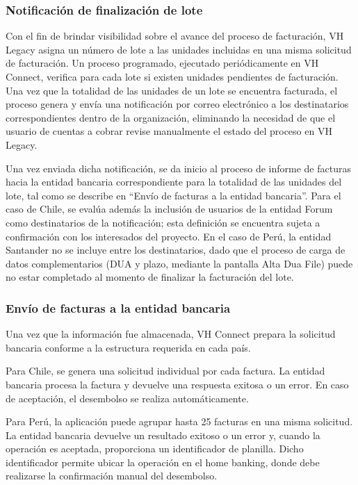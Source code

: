\subsubsection{Notificación de finalización de lote}

Con el fin de brindar visibilidad sobre el avance del proceso de facturación, VH Legacy asigna un número de lote a las unidades incluidas en una misma solicitud de facturación. Un proceso programado, ejecutado periódicamente en VH Connect, verifica para cada lote si existen unidades pendientes de facturación. Una vez que la totalidad de las unidades de un lote se encuentra facturada, el proceso genera y envía una notificación por correo electrónico a los destinatarios correspondientes dentro de la organización, eliminando la necesidad de que el usuario de cuentas a cobrar revise manualmente el estado del proceso en VH Legacy.

Una vez enviada dicha notificación, se da inicio al proceso de informe de facturas hacia la entidad bancaria correspondiente para la totalidad de las unidades del lote, tal como se describe en ``Envío de facturas a la entidad bancaria''. Para el caso de Chile, se evalúa además la inclusión de usuarios de la entidad Forum como destinatarios de la notificación; esta definición se encuentra sujeta a confirmación con los interesados del proyecto. En el caso de Perú, la entidad Santander no se incluye entre los destinatarios, dado que el proceso de carga de datos complementarios (DUA y plazo, mediante la pantalla Alta Dua File) puede no estar completado al momento de finalizar la facturación del lote.

\subsubsection{Envío de facturas a la entidad bancaria}

Una vez que la información fue almacenada, VH Connect prepara la solicitud bancaria conforme a la estructura requerida en cada país.

Para Chile, se genera una solicitud individual por cada factura. La entidad bancaria procesa la factura y devuelve una respuesta exitosa o un error. En caso de aceptación, el desembolso se realiza automáticamente.

Para Perú, la aplicación puede agrupar hasta 25 facturas en una misma solicitud. La entidad bancaria devuelve un resultado exitoso o un error y, cuando la operación es aceptada, proporciona un identificador de planilla. Dicho identificador permite ubicar la operación en el home banking, donde debe realizarse la confirmación manual del desembolso.

